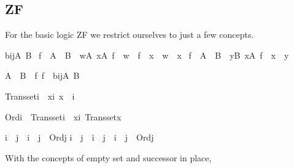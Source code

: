\subsection{ZF\label{sec:def-main-ZF}%
}
For the basic logic ZF we restrict ourselves to just a few
concepts.
%
\begin{isabelle}%
bij{\isacharparenleft}{\kern0pt}A{\isacharcomma}{\kern0pt}\ B{\isacharparenright}{\kern0pt}\ {\isasymequiv}\isanewline
{\isacharbraceleft}{\kern0pt}f\ {\isasymin}\ A\ {\isasymrightarrow}\ B\ {\isachardot}{\kern0pt}\ {\isasymforall}w{\isasymin}A{\isachardot}{\kern0pt}\ {\isasymforall}x{\isasymin}A{\isachardot}{\kern0pt}\ f\ {\isacharbackquote}{\kern0pt}\ w\ {\isacharequal}{\kern0pt}\ f\ {\isacharbackquote}{\kern0pt}\ x\ {\isasymlongrightarrow}\ w\ {\isacharequal}{\kern0pt}\ x{\isacharbraceright}{\kern0pt}\ {\isasyminter}\isanewline
{\isacharbraceleft}{\kern0pt}f\ {\isasymin}\ A\ {\isasymrightarrow}\ B\ {\isachardot}{\kern0pt}\ {\isasymforall}y{\isasymin}B{\isachardot}{\kern0pt}\ {\isasymexists}x{\isasymin}A{\isachardot}{\kern0pt}\ f\ {\isacharbackquote}{\kern0pt}\ x\ {\isacharequal}{\kern0pt}\ y{\isacharbraceright}{\kern0pt}%
\end{isabelle}%
\begin{isabelle}%
A\ {\isasymapprox}\ B\ {\isasymequiv}\ {\isasymexists}f{\isachardot}{\kern0pt}\ f\ {\isasymin}\ bij{\isacharparenleft}{\kern0pt}A{\isacharcomma}{\kern0pt}\ B{\isacharparenright}{\kern0pt}%
\end{isabelle}%
\begin{isabelle}%
Transset{\isacharparenleft}{\kern0pt}i{\isacharparenright}{\kern0pt}\ {\isasymequiv}\ {\isasymforall}x{\isasymin}i{\isachardot}{\kern0pt}\ x\ {\isasymsubseteq}\ i%
\end{isabelle}%
\begin{isabelle}%
Ord{\isacharparenleft}{\kern0pt}i{\isacharparenright}{\kern0pt}\ {\isasymequiv}\ Transset{\isacharparenleft}{\kern0pt}i{\isacharparenright}{\kern0pt}\ {\isasymand}\ {\isacharparenleft}{\kern0pt}{\isasymforall}x{\isasymin}i{\isachardot}{\kern0pt}\ Transset{\isacharparenleft}{\kern0pt}x{\isacharparenright}{\kern0pt}{\isacharparenright}{\kern0pt}%
\end{isabelle}%
\begin{isabelle}%
i\ {\isacharless}{\kern0pt}\ j\ {\isasymequiv}\ i\ {\isasymin}\ j\ {\isasymand}\ Ord{\isacharparenleft}{\kern0pt}j{\isacharparenright}{\kern0pt}\isasep\isanewline%
i\ {\isasymle}\ j\ {\isasymlongleftrightarrow}\ i\ {\isacharless}{\kern0pt}\ j\ {\isasymor}\ i\ {\isacharequal}{\kern0pt}\ j\ {\isasymand}\ Ord{\isacharparenleft}{\kern0pt}j{\isacharparenright}{\kern0pt}%
\end{isabelle}%
With the concepts of empty set and successor in place,%

